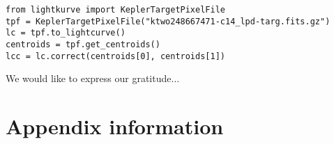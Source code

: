 \documentclass[twocolumn]{aastex62}
\begin{document}
\begin{verbatim}
from lightkurve import KeplerTargetPixelFile
tpf = KeplerTargetPixelFile("ktwo248667471-c14_lpd-targ.fits.gz")
lc = tpf.to_lightcurve()
centroids = tpf.get_centroids()
lcc = lc.correct(centroids[0], centroids[1])
\end{verbatim}

\acknowledgments

We would like to express our gratitude...

\vspace{5mm}




\appendix

\section{Appendix information}



\end{document}
